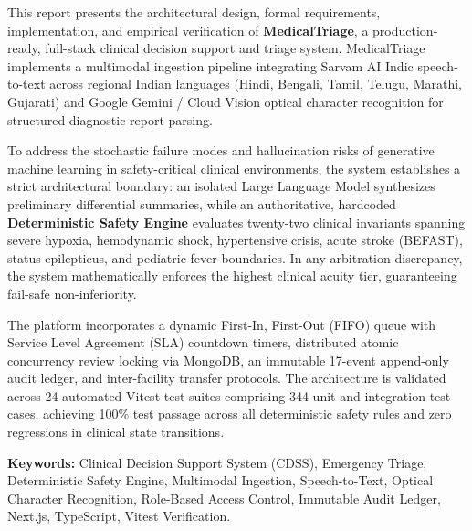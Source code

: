 \documentclass[11pt,a4paper,oneside]{report}
\begin{document}
This report presents the architectural design, formal requirements, implementation, and empirical verification of \textbf{MedicalTriage}, a production-ready, full-stack clinical decision support and triage system. MedicalTriage implements a multimodal ingestion pipeline integrating Sarvam AI Indic speech-to-text across regional Indian languages (Hindi, Bengali, Tamil, Telugu, Marathi, Gujarati) and Google Gemini / Cloud Vision optical character recognition for structured diagnostic report parsing.

To address the stochastic failure modes and hallucination risks of generative machine learning in safety-critical clinical environments, the system establishes a strict architectural boundary: an isolated Large Language Model synthesizes preliminary differential summaries, while an authoritative, hardcoded \textbf{Deterministic Safety Engine} evaluates twenty-two clinical invariants spanning severe hypoxia, hemodynamic shock, hypertensive crisis, acute stroke (BEFAST), status epilepticus, and pediatric fever boundaries. In any arbitration discrepancy, the system mathematically enforces the highest clinical acuity tier, guaranteeing fail-safe non-inferiority.

The platform incorporates a dynamic First-In, First-Out (FIFO) queue with Service Level Agreement (SLA) countdown timers, distributed atomic concurrency review locking via MongoDB, an immutable 17-event append-only audit ledger, and inter-facility transfer protocols. The architecture is validated across 24 automated Vitest test suites comprising 344 unit and integration test cases, achieving 100\% test passage across all deterministic safety rules and zero regressions in clinical state transitions.

\vspace{1em}
\noindent \textbf{Keywords:} Clinical Decision Support System (CDSS), Emergency Triage, Deterministic Safety Engine, Multimodal Ingestion, Speech-to-Text, Optical Character Recognition, Role-Based Access Control, Immutable Audit Ledger, Next.js, TypeScript, Vitest Verification.

\clearpage

\tableofcontents
\clearpage

\listoffigures
\clearpage

\listoftables
\clearpage
\end{document}
